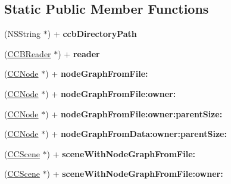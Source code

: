 \subsection*{Static Public Member Functions}
\begin{DoxyCompactItemize}
\item 
\hypertarget{interface_c_c_b_reader_abbf8b6841db8dc418d513e00e620f1d0}{(N\-S\-String $\ast$) + {\bfseries ccb\-Directory\-Path}}\label{interface_c_c_b_reader_abbf8b6841db8dc418d513e00e620f1d0}

\item 
\hypertarget{interface_c_c_b_reader_a2808739650f447d619e838d367c51fd8}{(\hyperlink{interface_c_c_b_reader}{C\-C\-B\-Reader} $\ast$) + {\bfseries reader}}\label{interface_c_c_b_reader_a2808739650f447d619e838d367c51fd8}

\item 
\hypertarget{interface_c_c_b_reader_a2e9732cb37a2f9f7a6894488e3cd3ad9}{(\hyperlink{class_c_c_node}{C\-C\-Node} $\ast$) + {\bfseries node\-Graph\-From\-File\-:}}\label{interface_c_c_b_reader_a2e9732cb37a2f9f7a6894488e3cd3ad9}

\item 
\hypertarget{interface_c_c_b_reader_a00e8d16a83d4db4971136b1cfe1241d0}{(\hyperlink{class_c_c_node}{C\-C\-Node} $\ast$) + {\bfseries node\-Graph\-From\-File\-:owner\-:}}\label{interface_c_c_b_reader_a00e8d16a83d4db4971136b1cfe1241d0}

\item 
\hypertarget{interface_c_c_b_reader_ae4bf38ac9e5483d801068b9bedfbe394}{(\hyperlink{class_c_c_node}{C\-C\-Node} $\ast$) + {\bfseries node\-Graph\-From\-File\-:owner\-:parent\-Size\-:}}\label{interface_c_c_b_reader_ae4bf38ac9e5483d801068b9bedfbe394}

\item 
\hypertarget{interface_c_c_b_reader_afd2420f28f587612b4c8398fa8860e6d}{(\hyperlink{class_c_c_node}{C\-C\-Node} $\ast$) + {\bfseries node\-Graph\-From\-Data\-:owner\-:parent\-Size\-:}}\label{interface_c_c_b_reader_afd2420f28f587612b4c8398fa8860e6d}

\item 
\hypertarget{interface_c_c_b_reader_aa3f659e1e110ed7ae7acb3656703f603}{(\hyperlink{interface_c_c_scene}{C\-C\-Scene} $\ast$) + {\bfseries scene\-With\-Node\-Graph\-From\-File\-:}}\label{interface_c_c_b_reader_aa3f659e1e110ed7ae7acb3656703f603}

\item 
\hypertarget{interface_c_c_b_reader_ac39d4f31c9026861313448176455c19b}{(\hyperlink{interface_c_c_scene}{C\-C\-Scene} $\ast$) + {\bfseries scene\-With\-Node\-Graph\-From\-File\-:owner\-:}}\label{interface_c_c_b_reader_ac39d4f31c9026861313448176455c19b}


\end{DoxyCompactItemize}
